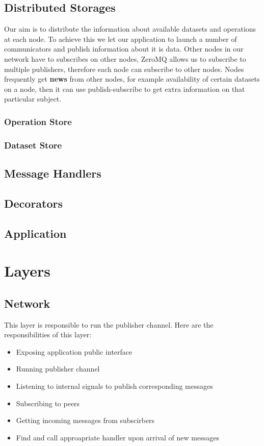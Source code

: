 \subsection{Distributed Storages}
Our aim is to distribute the information about available datasets and operations at each node. To achieve this
we let our application to launch a number of communicators and publish information about it is data.
Other nodes in our network have to subscribes on other nodes, ZeroMQ allows us to subscribe
to multiple publishers, therefore each node can subscribe to other nodes. Nodes frequently get
\textbf{news} from other nodes, for example availability of certain datasets on a node, then it
can use publish-subscribe to get extra information on that particular subject.
\subsubsection{Operation Store}
\subsubsection{Dataset Store}
\subsection{Message Handlers}
\subsection{Decorators}
\subsection{Application}

\section{Layers}
\subsection{Network}
This layer is responsible to run the publisher channel. 
Here are the responsibilities of this layer:

\begin{itemize}
\item Exposing application public interface
\item Running publisher channel
\item Listening to internal signals to publish corresponding messages
\item Subscribing to peers
\item Getting incoming messages from subscirbers 
\item Find and call approapriate handler upon arrival of new messages
\end{itemize}

